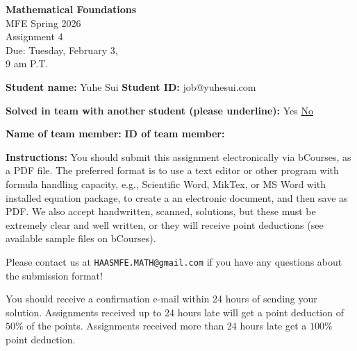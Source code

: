 \documentclass{article}
\begin{document}
\begin{center}
\textbf{Mathematical Foundations} \\
MFE Spring 2026 \\
Assignment 4 \\
Due: Tuesday, February 3, \\
9 am P.T.
\end{center}

\vspace{1em}

\noindent \textbf{Student name:} Yuhe Sui \hspace{3.54cm} \textbf{Student ID:} job@yuhesui.com

\vspace{1em}

\noindent \textbf{Solved in team with another student (please underline):} \hspace{1cm} Yes \hspace{1cm} \underline{No}

\vspace{1em}

\noindent \textbf{Name of team member:} \hspace{3cm} \textbf{ID of team member:}

\vspace{1em}

\noindent \textbf{Instructions:} You should submit this assignment electronically via bCourses, as a PDF file. The preferred format is to use a text editor or other program with formula handling capacity, e.g., Scientific Word, MikTex, or MS Word with installed equation package, to create a an electronic document, and then save as PDF. We also accept handwritten, scanned, solutions, but these must be extremely clear and well written, or they will receive point deductions (see available sample files on bCourses).

\vspace{1em}

\noindent Please contact us at \texttt{HAASMFE.MATH@gmail.com} if you have any questions about the submission format!

\vspace{1em}

\noindent You should receive a confirmation e-mail within 24 hours of sending your solution. Assignments received up to 24 hours late will get a point deduction of $50\%$ of the points. Assignments received more than 24 hours late get a $100\%$ point deduction.

\vspace{1em}
\end{document}
